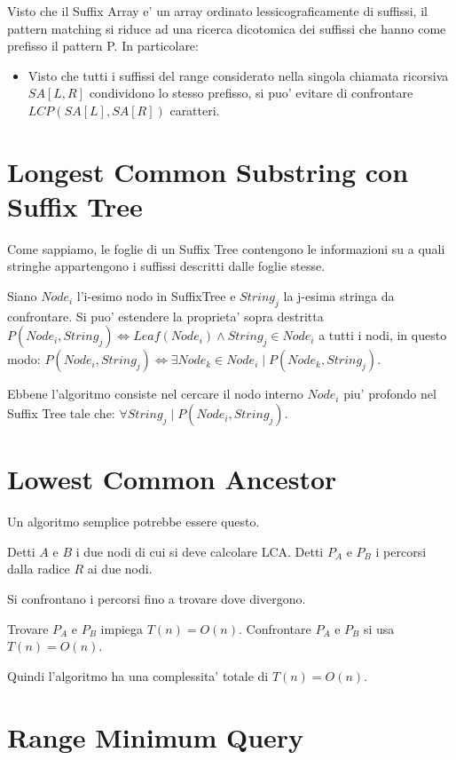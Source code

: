 Visto che il Suffix Array e' un array ordinato lessicograficamente di suffissi, il pattern matching si riduce ad una ricerca dicotomica dei suffissi che hanno come prefisso il pattern P.
In particolare:

\begin{itemize}
    \item Visto che tutti i suffissi del range considerato nella singola chiamata ricorsiva $SA[L, R]$ condividono lo stesso prefisso, si puo' evitare di confrontare $LCP(SA[L], SA[R])$ caratteri.

\end{itemize}

\section{Longest Common Substring con Suffix Tree}

Come sappiamo, le foglie di un Suffix Tree contengono le informazioni su a quali stringhe appartengono i suffissi descritti dalle foglie stesse.

Siano $Node_i$ l'i-esimo nodo in SuffixTree e $String_j$ la j-esima stringa da confrontare.
Si puo' estendere la proprieta' sopra destritta $P(Node_i, String_j) \Leftrightarrow Leaf(Node_i) \land String_j \in Node_i$ a tutti i nodi, in questo modo:
$P(Node_i, String_j) \Leftrightarrow \exists Node_k \in Node_i \mid P(Node_k, String_j)$.

Ebbene l'algoritmo consiste nel cercare il nodo interno $Node_i$ piu' profondo nel Suffix Tree tale che:
$\forall String_j \mid P(Node_i, String_j)$.

\section{Lowest Common Ancestor}

Un algoritmo semplice potrebbe essere questo.

Detti $A$ e $B$ i due nodi di cui si deve calcolare LCA.
Detti $P_{A}$ e $P_{B}$ i percorsi dalla radice $R$ ai due nodi.

Si confrontano i percorsi fino a trovare dove divergono.

Trovare $P_{A}$ e $P_{B}$ impiega $T(n) = O(n)$.
Confrontare $P_{A}$ e $P_{B}$ si usa $T(n) = O(n)$.

Quindi l'algoritmo ha una complessita' totale di $T(n) = O(n)$.

\section{Range Minimum Query}


